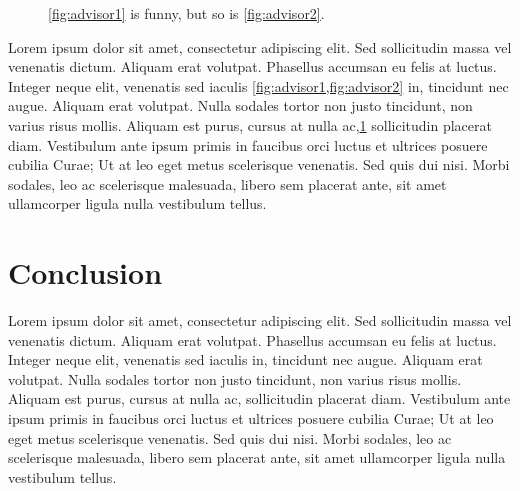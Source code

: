 \begin{figure}[!h]
	\hspace{-5pt}
	\hspace{-10pt}
	\caption{\cref{fig:advisor1} is funny, but so is \cref{fig:advisor2}.}
	\label{fig:advisors}
\end{figure}

Lorem ipsum dolor sit amet, consectetur adipiscing elit. Sed sollicitudin massa vel venenatis dictum. Aliquam erat volutpat. Phasellus accumsan eu felis at luctus. Integer neque elit, venenatis sed iaculis \cref{fig:advisor1,fig:advisor2} in, tincidunt nec augue. Aliquam erat volutpat. Nulla sodales tortor non justo tincidunt, non varius risus mollis. Aliquam est purus, cursus at nulla ac,\cref{fig:advisors} sollicitudin placerat diam. Vestibulum ante ipsum primis in faucibus orci luctus et ultrices posuere cubilia Curae; Ut at leo eget metus scelerisque venenatis. Sed quis dui nisi. Morbi sodales, leo ac scelerisque malesuada, libero sem placerat ante, sit amet ullamcorper ligula nulla vestibulum tellus.

\section{Conclusion} \label{sec:conc}
Lorem ipsum dolor sit amet, consectetur adipiscing elit. Sed sollicitudin massa vel venenatis dictum. Aliquam erat volutpat. Phasellus accumsan eu felis at luctus. Integer neque elit, venenatis sed iaculis in, tincidunt nec augue. Aliquam erat volutpat. Nulla sodales tortor non justo tincidunt, non varius risus mollis. Aliquam est purus, cursus at nulla ac, sollicitudin placerat diam. Vestibulum ante ipsum primis in faucibus orci luctus et ultrices posuere cubilia Curae; Ut at leo eget metus scelerisque venenatis. Sed quis dui nisi. Morbi sodales, leo ac scelerisque malesuada, libero sem placerat ante, sit amet ullamcorper ligula nulla vestibulum tellus.



